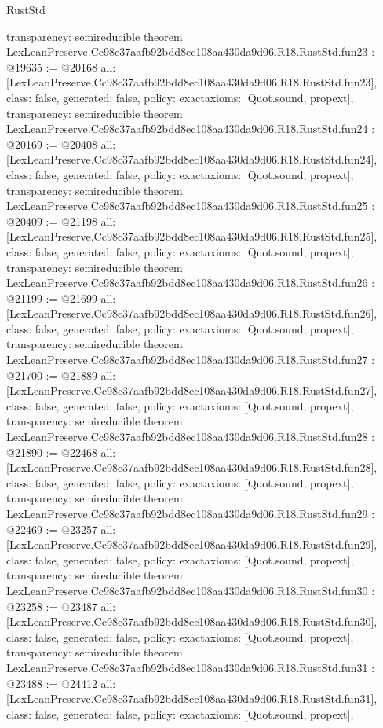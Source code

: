 \begin{lexlean}{RustStd}
\begin{coremodule}
{  transparency: semireducible
}
theorem LexLeanPreserve.Cc98c37aafb92bdd8ec108aa430da9d06.R18.RustStd.fun23 : @19635 := @20168 {
  all: [LexLeanPreserve.Cc98c37aafb92bdd8ec108aa430da9d06.R18.RustStd.fun23],
  class: false,
  generated: false,
  policy: exact{axioms: [Quot.sound, propext]},
  transparency: semireducible
}
theorem LexLeanPreserve.Cc98c37aafb92bdd8ec108aa430da9d06.R18.RustStd.fun24 : @20169 := @20408 {
  all: [LexLeanPreserve.Cc98c37aafb92bdd8ec108aa430da9d06.R18.RustStd.fun24],
  class: false,
  generated: false,
  policy: exact{axioms: [Quot.sound, propext]},
  transparency: semireducible
}
theorem LexLeanPreserve.Cc98c37aafb92bdd8ec108aa430da9d06.R18.RustStd.fun25 : @20409 := @21198 {
  all: [LexLeanPreserve.Cc98c37aafb92bdd8ec108aa430da9d06.R18.RustStd.fun25],
  class: false,
  generated: false,
  policy: exact{axioms: [Quot.sound, propext]},
  transparency: semireducible
}
theorem LexLeanPreserve.Cc98c37aafb92bdd8ec108aa430da9d06.R18.RustStd.fun26 : @21199 := @21699 {
  all: [LexLeanPreserve.Cc98c37aafb92bdd8ec108aa430da9d06.R18.RustStd.fun26],
  class: false,
  generated: false,
  policy: exact{axioms: [Quot.sound, propext]},
  transparency: semireducible
}
theorem LexLeanPreserve.Cc98c37aafb92bdd8ec108aa430da9d06.R18.RustStd.fun27 : @21700 := @21889 {
  all: [LexLeanPreserve.Cc98c37aafb92bdd8ec108aa430da9d06.R18.RustStd.fun27],
  class: false,
  generated: false,
  policy: exact{axioms: [Quot.sound, propext]},
  transparency: semireducible
}
theorem LexLeanPreserve.Cc98c37aafb92bdd8ec108aa430da9d06.R18.RustStd.fun28 : @21890 := @22468 {
  all: [LexLeanPreserve.Cc98c37aafb92bdd8ec108aa430da9d06.R18.RustStd.fun28],
  class: false,
  generated: false,
  policy: exact{axioms: [Quot.sound, propext]},
  transparency: semireducible
}
theorem LexLeanPreserve.Cc98c37aafb92bdd8ec108aa430da9d06.R18.RustStd.fun29 : @22469 := @23257 {
  all: [LexLeanPreserve.Cc98c37aafb92bdd8ec108aa430da9d06.R18.RustStd.fun29],
  class: false,
  generated: false,
  policy: exact{axioms: [Quot.sound, propext]},
  transparency: semireducible
}
theorem LexLeanPreserve.Cc98c37aafb92bdd8ec108aa430da9d06.R18.RustStd.fun30 : @23258 := @23487 {
  all: [LexLeanPreserve.Cc98c37aafb92bdd8ec108aa430da9d06.R18.RustStd.fun30],
  class: false,
  generated: false,
  policy: exact{axioms: [Quot.sound, propext]},
  transparency: semireducible
}
theorem LexLeanPreserve.Cc98c37aafb92bdd8ec108aa430da9d06.R18.RustStd.fun31 : @23488 := @24412 {
  all: [LexLeanPreserve.Cc98c37aafb92bdd8ec108aa430da9d06.R18.RustStd.fun31],
  class: false,
  generated: false,
  policy: exact{axioms: [Quot.sound, propext]},
}
\end{coremodule}
\end{lexlean}

